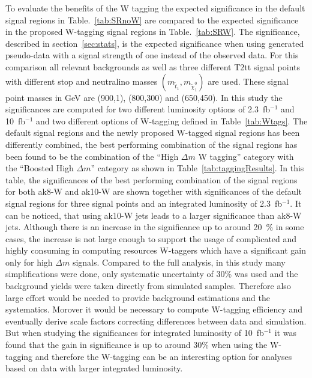 To evaluate the benefits of the W tagging the expected significance in the default signal regions in Table.~\ref{tab:SRnoW} are compared to the expected significance in the proposed W-tagging signal regions in Table.~\ref{tab:SRW}. The significance, described in section~\ref{sec:stats}, is the expected significance when using generated pseudo-data with a signal strength of one instead of the observed data. For this comparison all relevant backgrounds as well as three different T2tt signal points with different stop and neutralino masses $(m_{\tilde{t}_{1}}, m_{\tilde{\chi}^{0}_{1}})$ are used. These signal point masses in GeV are (900,1), (800,300) and (650,450). In this study the significances are computed for two different luminosity options of 2.3~fb$^{-1}$ and 10~fb$^{-1}$ and two different options of W-tagging defined in Table~\ref{tab:Wtags}. The default signal regions and the newly proposed W-tagged signal regions has been differently combined, the best performing combination of the signal regions has been found to be the combination of the ``High $\Delta m$ W tagging'' category with the ``Boosted High $\Delta m$'' category as shown in Table~\ref{tab:taggingResults}. In this table, the significances of the best performing combination of the signal regions for both ak8-W and ak10-W are shown together with significances of the default signal regions for three signal points and an integrated luminosity of 2.3~fb$^{-1}$. It can be noticed, that using ak10-W jets leads to a larger significance than ak8-W jets. Although there is an increase in the significance up to around 20~\% in some cases, the increase is not large enough to support the usage of complicated and highly consuming in computing resources W-taggers which have a significant gain only for high $\Delta m$ signals.  Compared to the full analysis, in this study many simplifications were done, only systematic uncertainty of 30\% was used and the background yields were taken directly from simulated samples. Therefore also large effort would be needed to provide background estimations and the systematics. Morover it would be necessary to compute W-tagging efficiency and eventually  derive scale factors correcting differences between data and simulation.  But when studying the significances for integrated luminosity of  10~fb$^{-1}$  it was found that the gain in significance is up to around 30\% when using the W-tagging and therefore the W-tagging can be an interesting option for analyses based on data with larger integrated luminosity. 

